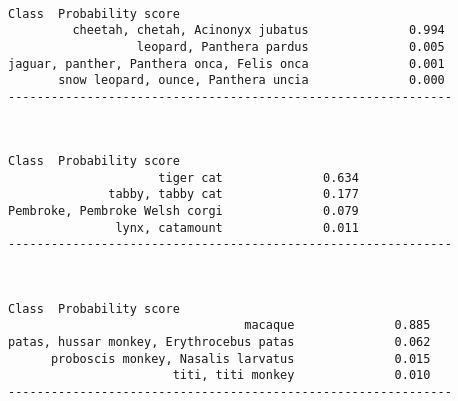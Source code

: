 \documentclass[11pt]{article}
\begin{document}
    \begin{center}
    \end{center}
    { \hspace*{\fill} \\}
    
    \begin{Verbatim}[commandchars=\\\{\}]
                                     Class  Probability score
         cheetah, chetah, Acinonyx jubatus              0.994
                  leopard, Panthera pardus              0.005
jaguar, panther, Panthera onca, Felis onca              0.001
       snow leopard, ounce, Panthera uncia              0.000
--------------------------------------------------------------
    \end{Verbatim}

    \begin{center}
    \end{center}
    { \hspace*{\fill} \\}
    
    \begin{Verbatim}[commandchars=\\\{\}]
                         Class  Probability score
                     tiger cat              0.634
              tabby, tabby cat              0.177
Pembroke, Pembroke Welsh corgi              0.079
               lynx, catamount              0.011
--------------------------------------------------------------
    \end{Verbatim}

    \begin{center}
    \end{center}
    { \hspace*{\fill} \\}
    
    \begin{Verbatim}[commandchars=\\\{\}]
                                   Class  Probability score
                                 macaque              0.885
patas, hussar monkey, Erythrocebus patas              0.062
      proboscis monkey, Nasalis larvatus              0.015
                       titi, titi monkey              0.010
--------------------------------------------------------------
    \end{Verbatim}
\end{document}
